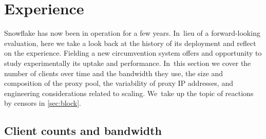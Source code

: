 \documentclass[letterpaper,twocolumn]{article}
\begin{document}
\begin{figure}[t]
{%
}
\label{fig:client-counts}
\end{figure}

\section{Experience}
\label{sec:experience}

Snowflake has now been in operation for a few years.
In~lieu of a forward-looking evaluation,
here we take a look back
at the history of its deployment
and reflect on the experience.
Fielding a new circumvention system offers
and opportunity to study experimentally
its uptake and performance.
In~this section we cover
the number of clients over time and the bandwidth they use,
the size and composition of the proxy pool,
the variability of proxy IP addresses,
and engineering considerations related to scaling.
We~take up the topic of reactions by censors
in \autoref{sec:block}.

\subsection{Client counts and bandwidth}
\label{sec:clients}
\end{document}
